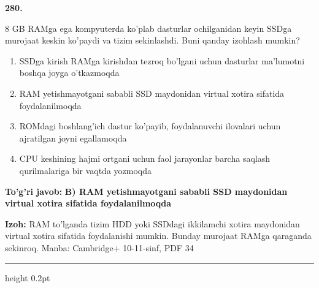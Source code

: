 \documentclass[10pt,a4paper]{article}
\begin{document}
{\bfseries\sffamily\color{ink} 280.}
\par
8 GB RAMga ega kompyuterda ko'plab dasturlar ochilganidan keyin SSDga murojaat keskin ko'paydi va tizim sekinlashdi. Buni qanday izohlash mumkin?
\begin{enumerate}[label=\Alph*),leftmargin=9mm]
\item SSDga kirish RAMga kirishdan tezroq bo'lgani uchun dasturlar ma'lumotni boshqa joyga o'tkazmoqda
\item RAM yetishmayotgani sababli SSD maydonidan virtual xotira sifatida foydalanilmoqda
\item ROMdagi boshlang'ich dastur ko'payib, foydalanuvchi ilovalari uchun ajratilgan joyni egallamoqda
\item CPU keshining hajmi ortgani uchun faol jarayonlar barcha saqlash qurilmalariga bir vaqtda yozmoqda
\end{enumerate}
\begin{tcolorbox}[enhanced,breakable,colback=teal!4,colframe=teal!60!black,boxrule=0.45pt,arc=1.2mm,left=2.7mm,right=2.7mm,top=1.8mm,bottom=1.8mm,before skip=2mm,after skip=2mm]
{\bfseries\sffamily\color{teal}To'g'ri javob:} \textbf{B) RAM yetishmayotgani sababli SSD maydonidan virtual xotira sifatida foydalanilmoqda}
\par\smallskip
{\bfseries Izoh:} RAM to'lganda tizim HDD yoki SSDdagi ikkilamchi xotira maydonidan virtual xotira sifatida foydalanishi mumkin. Bunday murojaat RAMga qaraganda sekinroq. Manba: Cambridge+ 10-11-sinf, PDF 34
\end{tcolorbox}
\vspace{2mm}\hrule height 0.2pt\vspace{3mm}
\end{document}
